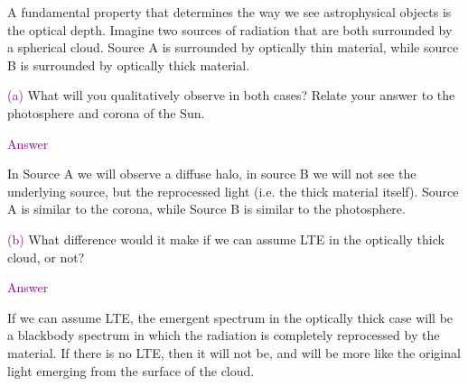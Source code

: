 \documentclass[UTF8, 12pt, a4paper, oneside, twocolumn, fontset=none]{ctexart}
\begin{document}
\noindent A fundamental property that determines the way we see astrophysical objects is the optical depth. Imagine two sources of radiation that are both surrounded by a spherical cloud. Source A is surrounded by optically thin material, while source B is surrounded by optically thick material.

\hspace*{\fill}

\noindent\textcolor{purple}{(a)} What will you qualitatively observe in both cases? Relate your answer to the photosphere and corona of the Sun.

\hspace*{\fill}

\noindent\textcolor{purple}{Answer}

In Source A we will observe a diffuse halo, in source B we will not see the underlying source, but the reprocessed light (i.e. the thick material itself). Source A is similar to the corona, while Source B is similar to the photosphere.

\hspace*{\fill}

\noindent\textcolor{purple}{(b)} What difference would it make if we can assume LTE in the optically thick cloud, or not?

\hspace*{\fill}

\noindent\textcolor{purple}{Answer}

If we can assume LTE, the emergent spectrum in the optically thick case will be a blackbody spectrum in which the radiation is completely reprocessed by the material. If there is no LTE, then it will not be, and will be more like the original light emerging from the surface of the cloud.


\end{document}
